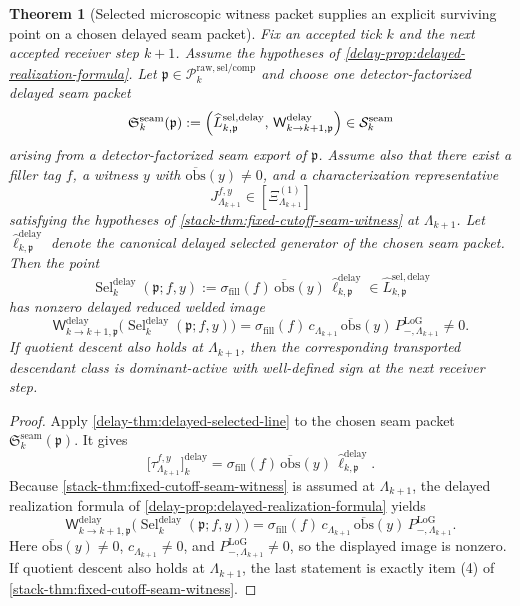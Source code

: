 \documentclass[11pt]{article}
\theoremstyle{definition}
\theoremstyle{plain}
\newtheorem{theorem}[definition]{Theorem}
\theoremstyle{remark}
\begin{document}
\begin{theorem}[Selected microscopic witness packet supplies an explicit surviving point on a chosen delayed seam packet]
\label{thm:promoted-selected-line-survival}
Fix an accepted tick \(k\) and the next accepted receiver step \(k+1\).
Assume the hypotheses of \cref{delay-prop:delayed-realization-formula}.
Let
\(
\mathfrak p\in\mathcal P^{\mathrm{raw,sel/comp}}_k
\)
and choose one detector-factorized delayed seam packet
\[
\mathfrak S^{\mathrm{seam}}_k(\mathfrak p)
:=
\Bigl(
\widehat L^{\mathrm{sel,delay}}_{k,\mathfrak p},\,
\mathsf W^{\mathrm{delay}}_{k\to k+1,\mathfrak p}
\Bigr)
\in
\mathcal S^{\mathrm{seam}}_k
\]
arising from a detector-factorized seam export of \(\mathfrak p\).
Assume also that there exist a filler tag \(f\), a witness \(y\) with
\(
\overline{\mathrm{obs}}(y)\neq 0
\),
and a characterization representative
\[
J^{f,y}_{\Lambda_{k+1}}\in[\Xi^{(1)}_{\Lambda_{k+1}}]
\]
satisfying the hypotheses of \cref{stack-thm:fixed-cutoff-seam-witness} at \(\Lambda_{k+1}\).
Let
\(
\widehat\ell^{\mathrm{delay}}_{k,\mathfrak p}
\)
denote the canonical delayed selected generator of the chosen seam packet.
Then the point
\[
\operatorname{Sel}^{\mathrm{delay}}_k(\mathfrak p;f,y)
:=
\sigma_{\mathrm{fill}}(f)\,
\overline{\mathrm{obs}}(y)\,
\widehat\ell^{\mathrm{delay}}_{k,\mathfrak p}
\in
\widehat L^{\mathrm{sel,delay}}_{k,\mathfrak p}
\]
has nonzero delayed reduced welded image
\[
\mathsf W^{\mathrm{delay}}_{k\to k+1,\mathfrak p}
\bigl(
\operatorname{Sel}^{\mathrm{delay}}_k(\mathfrak p;f,y)
\bigr)
=
\sigma_{\mathrm{fill}}(f)\,
c_{\Lambda_{k+1}}\,
\overline{\mathrm{obs}}(y)\,
P^{\mathrm{LoG}}_{-,\Lambda_{k+1}}
\neq 0.
\]
If quotient descent also holds at \(\Lambda_{k+1}\), then the corresponding transported descendant
class is dominant-active with well-defined sign at the next receiver step.
\end{theorem}

\begin{proof}
Apply \cref{delay-thm:delayed-selected-line} to the chosen seam packet
\(
\mathfrak S^{\mathrm{seam}}_k(\mathfrak p)
\).
It gives
\[
\big[\tau^{f,y}_{\Lambda_{k+1}}\big]^{\mathrm{delay}}_k
=
\sigma_{\mathrm{fill}}(f)\,
\overline{\mathrm{obs}}(y)\,
\widehat\ell^{\mathrm{delay}}_{k,\mathfrak p}.
\]
Because \cref{stack-thm:fixed-cutoff-seam-witness} is assumed at \(\Lambda_{k+1}\), the delayed
realization formula of \cref{delay-prop:delayed-realization-formula} yields
\[
\mathsf W^{\mathrm{delay}}_{k\to k+1,\mathfrak p}
\bigl(
\operatorname{Sel}^{\mathrm{delay}}_k(\mathfrak p;f,y)
\bigr)
=
\sigma_{\mathrm{fill}}(f)\,
c_{\Lambda_{k+1}}\,
\overline{\mathrm{obs}}(y)\,
P^{\mathrm{LoG}}_{-,\Lambda_{k+1}}.
\]
Here
\(
\overline{\mathrm{obs}}(y)\neq 0
\),
\(
c_{\Lambda_{k+1}}\neq 0
\),
and
\(
P^{\mathrm{LoG}}_{-,\Lambda_{k+1}}\neq 0
\),
so the displayed image is nonzero.
If quotient descent also holds at \(\Lambda_{k+1}\), the last statement is exactly item
\textnormal{(4)} of \cref{stack-thm:fixed-cutoff-seam-witness}.
\end{proof}
\end{document}
